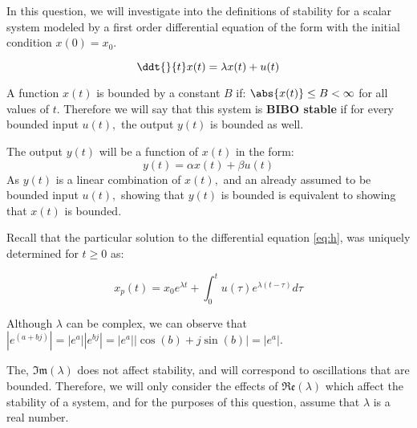 


In this question, we will investigate into the definitions of stability for a scalar system modeled by a first order differential equation of the form with the initial condition $x(0) = x_{0}.$ 

\begin{equation} \label{eq:h}
\ddt{}{t} x(t) = \lambda x(t) + u(t)
\end{equation}

A function $x(t)$ is bounded by a constant $B$ if: $\abs{x(t)} \leq B < \infty$ for all values of $t.$
Therefore we will say that this system is \textbf{BIBO stable} if for every bounded input $u(t),$ the output $y(t)$ is bounded as well. 

The output $y(t)$ will be a function of $x(t)$ in the form: 
\begin{equation}
y(t) = \alpha x(t) + \beta u(t)
\end{equation}
As $y(t)$ is a linear combination of $x(t),$ and an already assumed to be bounded input $u(t),$ showing that $y(t)$ is bounded is equivalent to showing that $x(t)$ is bounded.

Recall that the particular solution to the differential equation \eqref{eq:h}, was uniquely determined for $t \geq 0$ as:

\begin{equation} \label{eq:p}
x_{p}(t) = x_{0} e^{\lambda t} + \int_{0}^{t} u(\tau) e^{\lambda(t - \tau)} d\tau
\end{equation}

Although $\lambda$ can be complex, we can observe that $|e^{(a + bj)}| = |e^{a}| |e^{bj}| = |e^{a}| |\cos(b) + j \sin(b)| = |e^{a}|.$ 

The, $\mathfrak{Im}(\lambda)$ does not affect stability, and will correspond to oscillations that are bounded.
Therefore, we will only consider the effects of $\mathfrak{Re}(\lambda)$ which affect the stability of a system, 
and for the purposes of this question, assume that $\lambda$ is a real number.

